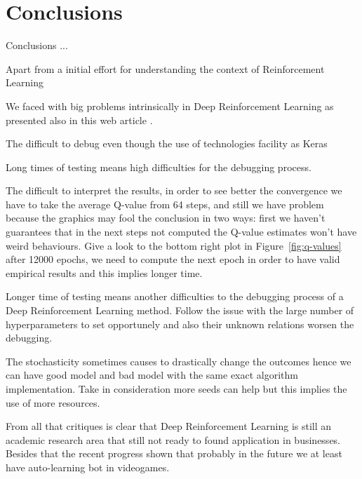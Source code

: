 \section{Conclusions}

Conclusions ...


Apart from a initial effort for understanding the context of Reinforcement Learning 

We faced with big problems intrinsically in Deep Reinforcement Learning as presented also in this web article \cite{rlblogpost}. 

The difficult to debug even though the use of technologies facility as Keras

Long times of testing means high difficulties for the debugging process.

The difficult to interpret the results, in order to see better the convergence we have to take the average Q-value from 64 steps, and still we have problem because the graphics may fool the conclusion in two ways: first we haven't guarantees that in the next steps not computed the Q-value estimates won't have weird behaviours. Give a look to the bottom right plot in Figure~\ref{fig:q-values} after 12000 epochs, we need to compute the next epoch in order to have valid empirical results and this implies longer time. 

Longer time of testing means another difficulties to the debugging process of a Deep Reinforcement Learning method. Follow the issue with the large number of hyperparameters to set opportunely and also their unknown relations worsen the debugging.

The stochasticity sometimes causes to drastically change the outcomes hence we can have good model and bad model with the same exact algorithm implementation. Take in consideration more seeds can help but this implies the use of more resources. 

From all that critiques is clear that Deep Reinforcement Learning is still an academic research area that still not ready to found application in businesses. Besides that the recent progress shown that probably in the future we at least have auto-learning bot in videogames.